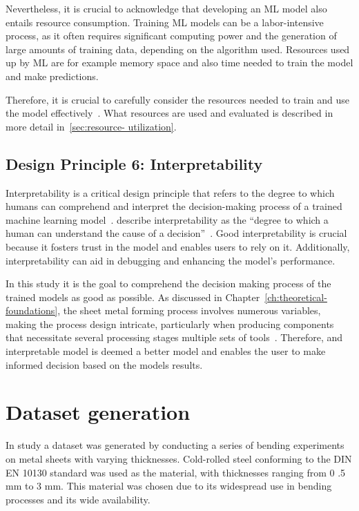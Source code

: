 Nevertheless, it is crucial to acknowledge that developing an \ac{ML} model also entails resource
consumption.
Training \ac{ML} models can be a labor-intensive process, as it often requires significant
computing power and the generation of large amounts of training data, depending on the algorithm
used.
Resources used up by \ac{ML} are for example memory space and also time needed to train the model and make predictions.

Therefore, it is crucial to carefully consider the resources needed to train and use the model
effectively~\cite[p. 16]{siebert2022construction}.
What resources are used and evaluated is described in more detail in~\ref{sec:resource- utilization}.

\subsection*{Design Principle 6: Interpretability}
Interpretability is a critical design principle that refers to the degree to which humans can comprehend and
interpret the decision-making process of a trained machine learning model~\cite[p. 13]{molnar2020interpretable}.
\cite{miller2019explanation} describe interpretability as the ``degree to which a human can understand the cause
of a decision''~\cite[p. 1]{miller2019explanation}.
Good interpretability is crucial because it fosters trust in the model and enables users to rely on it.
Additionally, interpretability can aid in debugging and enhancing the model's performance.

In this study it is the goal to comprehend the decision making process of the trained models as good as possible.
As discussed in Chapter~\ref{ch:theoretical-foundations}, the sheet metal forming process involves numerous
variables, making the process design intricate, particularly when producing components that necessitate several
processing stages multiple sets of tools~\cite[p. 1]{dib_singleensembleclassifiers_2020}.
Therefore,  and interpretable model is deemed a better model and enables the user to make informed decision based
on the models results.


\section{Dataset generation}\label{sec:dataset-generation}
In study a dataset was generated by conducting a series of bending experiments on metal sheets with varying thicknesses.
Cold-rolled steel conforming to the DIN EN 10130 standard was used as the material, with thicknesses ranging from 0
.5 mm to 3 mm.
This material was chosen due to its widespread use in bending processes and its wide availability.

